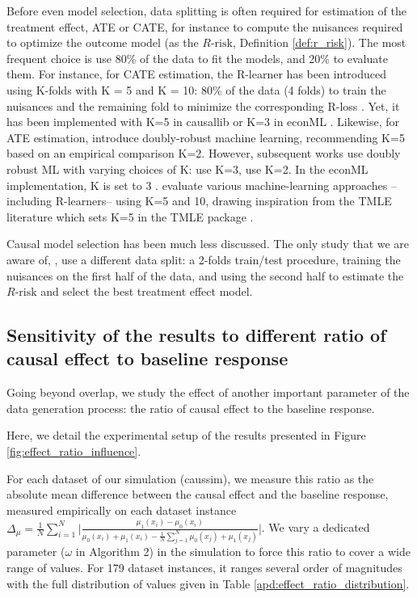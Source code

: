 \documentclass[a4paper,num-refs]{oup-contemporary}%
\begin{document}
Before even model selection, data splitting is often required for
estimation of the treatment effect, ATE or CATE, for instance to compute
the nuisances required to optimize the outcome model (as the
$R\text{-risk}$, Definition \ref{def:r_risk}).
%
The most frequent choice is use 80\% of the data to fit the models,
and 20\% to evaluate them.
%
For instance, for CATE estimation, the R-learner has been introduced using K-folds with K = 5
and K = 10: 80\% of the data (4 folds) to train the nuisances and the remaining
fold to minimize the corresponding R-loss \cite{nie_quasioracle_2017}.
Yet, it has been implemented with K=5 in causallib
\cite{causalevaluations} or K=3 in econML \cite{econml}.
Likewise, for ATE estimation, \cite{chernozhukov_double_2018}
introduce doubly-robust machine learning,
recommending K=5 based on an empirical comparison K=2. However,
subsequent works use doubly robust ML with varying choices
of K: \cite{loiseau_external_2022} use K=3, \cite{gao_assessment_2021} use
K=2. In the econML implementation, K is set to 3 \cite{econml}.
\cite{naimi2021challenges} evaluate various machine-learning approaches
--including R-learners-- using K=5 and 10, drawing inspiration from the
TMLE literature which sets
K=5 in the TMLE package \cite{tmle_package_2012}.

Causal model selection has been much less discussed. The only study that
we are aware of, \cite{schuler_comparison_2018}, use a different data
split: a 2-folds train/test procedure,
training the nuisances on the first half of the data, and using the
second half to estimate the $R\text{-risk}$ and select the best treatment
effect model.


\subsection{Sensitivity of the results to different ratio of causal effect to baseline response}\label{apd:effect_ratio}

Going beyond overlap, we study the effect of another important parameter of the
data generation process: the ratio of causal effect to the baseline response.

Here, we detail the experimental setup of the results presented in Figure \ref{fig:effect_ratio_influence}.

For each dataset of our simulation (caussim), we measure this ratio as the absolute mean
difference between the causal effect and the baseline response, measured
empirically on each dataset instance $\Delta_{\mu} = \frac{1}{N} \sum_{i=1}^N \big | \frac{\mu_{1}(x_i) - \mu_{0}(x_i)}{\mu_{0}(x_i) + \mu_{1}(x_i) - \frac{1}{N} \sum_{j=1}^N \mu_0(x_j) + \mu_1(x_j)} \big |$. We vary a
dedicated parameter ($\omega$ in Algorithm 2) in the simulation to force this
ratio to cover a wide range of values. For 179 dataset instances, it ranges
several order of magnitudes with the full distribution of values given in
Table \ref{apd:effect_ratio_distribution}.
\end{document}
